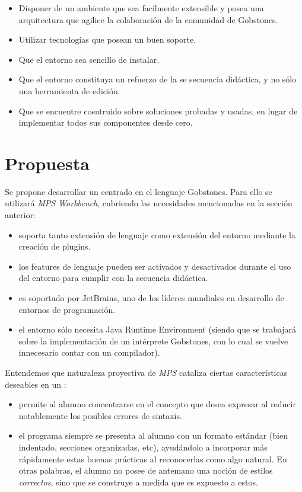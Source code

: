 \begin{itemize}
  \item Disponer de un ambiente que sea facilmente extensible y posea una arquitectura que agilice la colaboración de la comunidad de Gobstones.
  \item Utilizar tecnologías que posean un buen soporte.
  \item Que el entorno sea sencillo de instalar.
  \item Que el entorno constituya un refuerzo de la se secuencia didáctica, y no sólo una herramienta de edición.
  \item Que se encuentre cosntruido sobre soluciones probadas y usadas, en lugar de implementar todos sus componentes desde cero.
\end{itemize}


\section{Propuesta}

Se propone desarrollar un \ile centrado en el lenguaje Gobstones. Para ello se utilizará \textit{MPS Workbench}, cubriendo las necesidades mencionadas en la sección anterior:

\begin{itemize}
  \item soporta tanto extensión de lenguaje como extensión del entorno mediante la creación de plugins.
  \item los features de lenguaje pueden ser activados y desactivados durante el uso del entorno para cumplir con la secuencia didáctica.
  \item es soportado por JetBrains, uno de los líderes mundiales en desarrollo de entornos de programación.
  \item el entorno sólo necesita Java Runtime Environment (siendo que se trabajará sobre la implementación de un intérprete Gobstones, con lo cual se vuelve innecesario contar con un compilador).
\end{itemize}

Entendemos que naturaleza proyectiva de \textit{MPS} cataliza ciertas características deseables en un \ile:

\begin{itemize}
  \item permite al alumno concentrarse en el concepto que desea expresar al reducir notablemente los posibles errores de sintaxis.
  \item el programa siempre se presenta al alumno con un formato estándar (bien indentado, secciones organizadas, etc), ayudándolo a incorporar más rápidamente estas buenas prácticas al reconocerlas como algo natural. En otras palabras, el alumno no posee de antemano una noción de estilos \textit{correctos}, sino que se construye a medida que es expuesto a estos.
\end{itemize}



